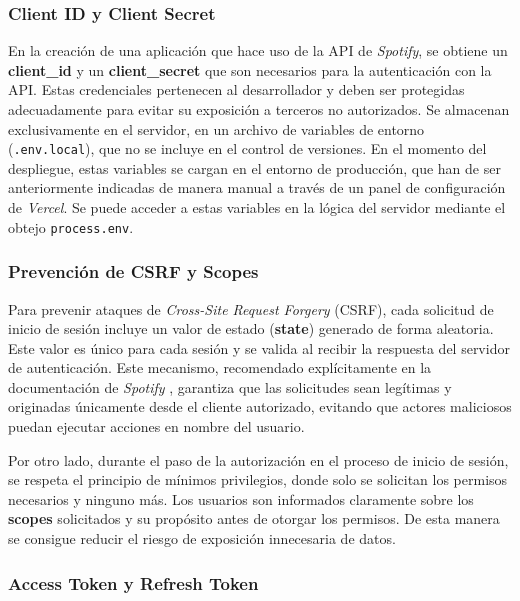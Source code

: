 \subsubsection*{Client ID y Client Secret}

En la creación de una aplicación que hace uso de la API de \textit{Spotify}, se obtiene un \textbf{client\_id} y un \textbf{client\_secret} que son necesarios para la autenticación con la API. Estas credenciales pertenecen al desarrollador y deben ser protegidas adecuadamente para evitar su exposición a terceros no autorizados. Se almacenan exclusivamente en el servidor, en un archivo de variables de entorno (\texttt{.env.local}), que no se incluye en el control de versiones. En el momento del despliegue, estas variables se cargan en el entorno de producción, que han de ser anteriormente indicadas de manera manual a través de un panel de configuración de \textit{Vercel}. Se puede acceder a estas variables en la lógica del servidor mediante el obtejo \texttt{process.env}.

\subsubsection*{Prevención de CSRF y Scopes}

Para prevenir ataques de \textit{Cross-Site Request Forgery} (CSRF), cada solicitud de inicio de sesión incluye un valor de estado (\textbf{state}) generado de forma aleatoria. Este valor es único para cada sesión y se valida al recibir la respuesta del servidor de autenticación. Este mecanismo, recomendado explícitamente en la documentación de \textit{Spotify} \cite{spotifyAuthCodeFlow2025}, garantiza que las solicitudes sean legítimas y originadas únicamente desde el cliente autorizado, evitando que actores maliciosos puedan ejecutar acciones en nombre del usuario.

Por otro lado, durante el paso de la autorización en el proceso de inicio de sesión, se respeta el principio de mínimos privilegios, donde solo se solicitan los permisos necesarios y ninguno más. Los usuarios son informados claramente sobre los \textbf{scopes} solicitados y su propósito antes de otorgar los permisos. De esta manera se consigue reducir el riesgo de exposición innecesaria de datos.

\subsubsection*{Access Token y Refresh Token}

